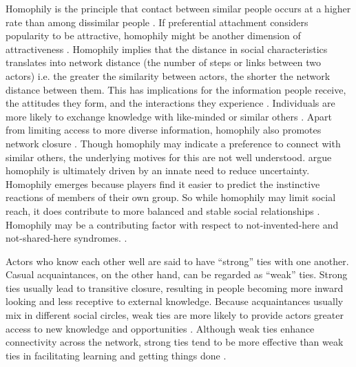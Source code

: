 Homophily is the principle that contact between similar people occurs at a higher rate than among dissimilar people \citep{mcpherson2001birds}. If preferential attachment considers popularity to be attractive, homophily might be another dimension of attractiveness \citep{wang2014homophily}. Homophily implies that the distance in social characteristics translates into network distance (the number of steps or links between two actors) i.e. the greater the similarity between actors, the shorter the network distance between them. This has implications for the information people receive, the attitudes they form, and the interactions they experience \citep{mcpherson2001birds}. Individuals are more likely to exchange knowledge with like-minded or similar others \citep{su2010understanding}. Apart from limiting access to more diverse information, homophily also promotes network closure \citep{kossinets2009origins}. Though homophily may indicate a preference to connect with similar others, the underlying motives for this are not well understood. \citet{kets2016belief} argue homophily is ultimately driven by an innate need to reduce uncertainty. Homophily emerges because players find it easier to predict the instinctive reactions of members of their own group. So while homophily may limit social reach, it does contribute to more balanced and stable social relationships \citep{scott2011sage,baccara2013homophily}. Homophily may be a contributing factor with respect to not\hyp{}invented\hyp{}here and not\hyp{}shared\hyp{}here syndromes. . \medskip

Actors who know each other well are said to have \enquote{strong} ties with one another. Casual acquaintances, on the other hand, can be regarded as \enquote{weak} ties. Strong ties usually lead to transitive closure, resulting in people becoming more inward looking and less receptive to external knowledge. Because acquaintances usually mix in different social circles, weak ties are more likely to provide actors greater access to new knowledge and opportunities \citep{granovetter1973strength}. Although weak ties enhance connectivity across the network, strong ties tend to be more effective than weak ties in facilitating learning and getting things done \citep{ahuja2000collaboration,burt2004structural,rost2011strength,phelps2012knowledge}. \medskip

